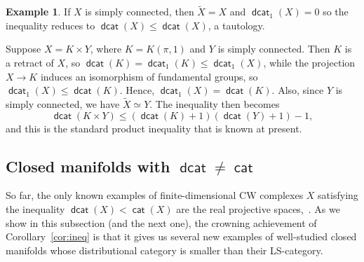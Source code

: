 \documentclass[amscd,amssymb,verbatim,11pt]{amsart}
\theoremstyle{plain}
\theoremstyle{definition}
\newtheorem{ex}[thm]{Example}
\DeclareMathOperator{\cat}{{\mathsf{cat}}}
\DeclareMathOperator{\dcat}{{\mathsf{dcat}}}
\begin{document}
\begin{ex}\label{exam:1connected}
If $X$ is simply connected, then $\widetilde X = X$ and $\dcat_1(X)=0$ so
the inequality reduces to $\dcat(X) \leq \dcat(X)$, a tautology. 

Suppose $X = K \times Y$, where $K=K(\pi,1)$ and $Y$ is simply connected. 
Then $K$ is a retract of $X$, so $\dcat(K) = \dcat_1(K) \leq \dcat_1(X)$, while the projection $X \to K$ induces an isomorphism of fundamental
groups, so $\dcat_1(X) \leq \dcat(K)$. Hence, $\dcat_1(X) = \dcat(K)$. 
Also, since $Y$ is simply connected, we have $\widetilde X \simeq Y$. The 
inequality then becomes 
$$\dcat(K \times Y) \leq (\dcat(K) + 1)(\dcat(Y) + 1) - 1,$$
and this is the standard product inequality that is known at present.
\end{ex}

\subsection{Closed manifolds with $\dcat\ne \cat$}\label{subsec:dcat ne cat}

So far, the only known examples of finite-dimensional CW complexes $X$ satisfying the inequality $\dcat(X)<\cat(X)$ are the real projective spaces,~\cite{DJ,KW}. As we show in this subsection (and the next one), the crowning achievement of Corollary~\ref{cor:ineq} is that it gives us several new examples of well-studied closed manifolds whose distributional category is smaller than their LS-category. 
\end{document}
